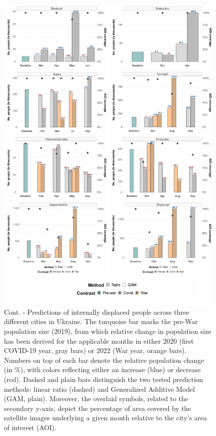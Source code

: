 \documentclass[sn-basic]{sn-jnl}%
\begin{document}
{\begin{appendices}
\begin{figure}[h!]
\begin{center}
\includegraphics[scale = 0.6]{Figures/SM_IDP_pred_Fig5.pdf}
\end{center}
\caption{Cont. - Predictions of internally displaced people across three different cities in Ukraine. The turquoise bar marks the pre-War population size (2019), from which relative change in population size has been derived for the applicable months in either 2020 (first COVID-19 year, gray bars) or 2022 (War year, orange bars). Numbers on top of each bar denote the relative population change (in \%), with colors reflecting either an increase (blue) or decrease (red). Dashed and plain bars distinguish the two tested prediction methods: linear ratio (dashed) and Generalized Additive Model (GAM, plain). Moreover, the overlaid symbols, related to the secondary y-axis, depict the percentage of area covered by the satellite images underlying a given month relative to the city's area of interest (AOI).}
\label{figSM_IDP_pred_Fig5}
\end{figure}




\end{appendices}}
\end{document}
